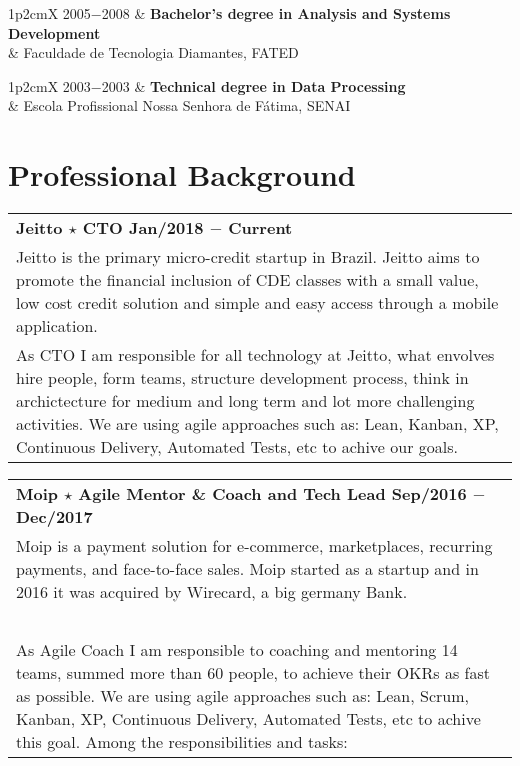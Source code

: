 \documentclass[a4paper, oneside, final]{scrartcl}
\newcommand{\vspc}{\vspace{0.15cm}} %
\begin{document}
\begin{center}
\begin{tabularx}{1\linewidth}{p{2cm}X}
2005$-$2008 & {\bf Bachelor's degree in Analysis and Systems Development}\\
            & Faculdade de Tecnologia Diamantes, FATED \vspc\\
\end{tabularx}

\begin{tabularx}{1\linewidth}{p{2cm}X}
2003$-$2003 & {\bf Technical degree in Data Processing}\\
            & Escola Profissional Nossa Senhora de Fátima, SENAI\\
\end{tabularx}

\section{Professional Background}
\begin{tabularx}{1\linewidth}{X}
{\bf Jeitto $\star$ CTO \hfill Jan/2018 $-$ Current} \\
Jeitto is the primary micro-credit startup in Brazil. Jeitto aims to promote the financial inclusion of CDE classes with a small value, low cost credit solution and simple and easy access through a mobile application. \\
As CTO I am responsible for all technology at Jeitto, what envolves hire people, form teams, structure development process, think in archictecture for medium and long term and lot more challenging activities. We are using agile approaches such as: Lean, Kanban, XP, Continuous Delivery, Automated Tests, etc to achive our goals. \\
\end{tabularx}

\begin{tabularx}{1\linewidth}{X}
{\bf Moip $\star$ Agile Mentor \& Coach and Tech Lead \hfill Sep/2016 $-$ Dec/2017} \\
Moip is a payment solution for e-commerce, marketplaces, recurring payments, and face-to-face sales. Moip started as a startup and in 2016 it was acquired by Wirecard, a big germany Bank. \\ \ \\

As Agile Coach I am responsible to coaching and mentoring 14 teams, summed more than 60 people, to achieve their OKRs as fast as possible. We are using agile approaches such as: Lean, Scrum, Kanban, XP, Continuous Delivery, Automated Tests, etc to achive this goal. Among the responsibilities and tasks:


\end{tabularx}
\end{center}
\end{document}
